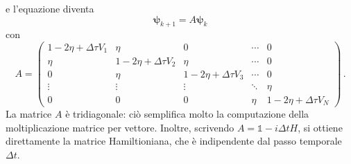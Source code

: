 \documentclass[a4paper, titlepage]{article}
\numberwithin{equation}{section}
\begin{document}
e l'equazione diventa
\begin{equation}
    \bm{\psi}_{k+1} = A\bm{\psi}_k
    \label{eq:evol_mat}
\end{equation}
con
\begin{equation*} 
    A = \begin{pmatrix}
    1-2\eta + \Delta\tau V_1 & \eta & 0 & \cdots & 0 \\
    \eta & 1-2\eta + \Delta\tau V_2 & \eta & \cdots & 0 \\
     0 & \eta & 1-2\eta + \Delta\tau V_3 & \cdots & 0 \\
    \vdots & \vdots & \vdots & \ddots & \eta \\
    0 & 0 & 0 & \eta & 1-2\eta + \Delta\tau V_N 
    \end{pmatrix}\, . 
\end{equation*}
La matrice $A$ è tridiagonale: ciò semplifica molto la computazione della moltiplicazione matrice per vettore. Inoltre, scrivendo $A = \mathbb{1} - i\Delta t H$, si ottiene direttamente la matrice Hamiltioniana, che è indipendente dal passo temporale $\Delta t$.
\end{document}
